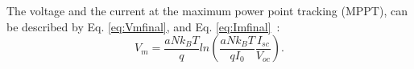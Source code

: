 %
%
%
%
%
%
%
%
The voltage and the current at the maximum power point tracking (MPPT), can be described by Eq. \eqref{eq:Vmfinal}, and Eq. \eqref{eq:Imfinal}~\cite{Saloux}: %
\begin{equation}
\label{eq:Vmfinal}
V_{m}=\dfrac{aNk_{B}T}{q} ln \left( \dfrac{aNk_{B}T}{qI_{0}} \dfrac{I_{sc}}{V_{oc}}  \right). 
\end{equation}

